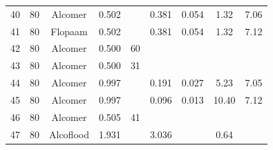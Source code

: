 \begin{appendices}
\begin{center}
\begin{longtable}{|c|c|c|c|c|c|c|c|c|}
40	&	80	&	Alcomer	&	0.502	&		&	0.381	&	0.054	&	1.32	&	7.06	\\
41	&	80	&	Flopaam 	&	0.502	&		&	0.381	&	0.054	&	1.32	&	7.12	\\
42	&	80	&	Alcomer	&	0.500	&	60	&		&		&		&		\\
43	&	80	&	Alcomer	&	0.500	&	31	&		&		&		&		\\
44	&	80	&	Alcomer	&	0.997	&		&	0.191	&	0.027	&	5.23	&	7.05	\\
45	&	80	&	Alcomer	&	0.997	&		&	0.096	&	0.013	&	10.40	&	7.12	\\
46	&	80	&	Alcomer	&	0.505	&	41	&		&		&		&		\\
47	&	80	&	Alcoflood	&	1.931	&		&	3.036	&		&	0.64	&		\\
\end{longtable}
\label{tab:gelSystemSummary}
\end{center}



\end{appendices}

